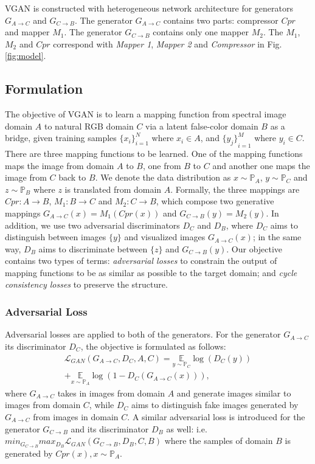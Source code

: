 \documentclass[10pt,conference,a4paper]{IEEEtran}
\begin{document}
VGAN is constructed with heterogeneous network architecture for generators $G_{A\rightarrow C}$ and $G_{C\rightarrow B}$.
The generator $G_{A\rightarrow C}$ contains two parts: compressor $Cpr$ and mapper $M_1$. The generator $G_{C\rightarrow B}$ contains only one mapper $M_2$. The $M_1$, $M_2$ and $Cpr$ correspond with \textit{Mapper 1}, \textit{Mapper 2} and \textit{Compressor} in Fig. \ref{fig:model}.

\subsection{Formulation}
The objective of VGAN is to learn a mapping function from spectral image domain $A$ to natural RGB domain $C$ via a latent false-color domain $B$ as a bridge, given training samples ${\{x_i\}}_{i=1}^N$ where $x_i \in A$, and ${\{y_j\}}_{i=1}^M$ where $y_i \in C$. There are three mapping functions to be learned. One of the mapping functions maps the image from domain $A$ to $B$, one from $B$ to $C$ and another one maps the image from $C$ back to $B$. We denote the data distribution as $x\sim \mathbb{P}_A$, $y\sim \mathbb{P}_C$ and $z\sim \mathbb{P}_B$ where $z$ is translated from domain $A$. Formally, the three mappings are $Cpr:A\rightarrow B$, $M_1:B\rightarrow C$ and $M_2:C\rightarrow B$, which compose two generative mappings $G_{A\rightarrow C}(x)=M_1(Cpr(x))$ and $G_{C\rightarrow B}(y)=M_2(y)$. In addition, we use two adversarial discriminators $D_C$ and $D_B$, where $D_C$ aims to distinguish between images $\{y\}$ and visualized images $G_{A\rightarrow C}(x)$; in the same way, $D_B$ aims to discriminate between $\{z\}$ and $G_{C\rightarrow B}(y)$. Our objective contains two types of terms: \textit{adversarial losses} to constrain the output of mapping functions to be as similar as possible to the target domain; and \textit{cycle consistency losses} to preserve the structure.

\subsubsection{Adversarial Loss}
Adversarial losses are applied to both of the generators. For the generator $G_{A\rightarrow C}$ its discriminator $D_C$, the objective is formulated as follows:
\begin{multline}\label{eq:adv_loss}
  \mathcal{L}_{GAN}(G_{A\rightarrow C},D_C,A,C) = \underset{y\sim \mathbb{P}_C}{\mathbb{E}} \log(D_C(y)) \\
  + \underset{x\sim \mathbb{P}_A}{\mathbb{E}} \log(1-D_C(G_{A\rightarrow C}(x))),
\end{multline}
where $G_{A\rightarrow C}$ takes in images from domain $A$ and generate images similar to images from domain $C$, while $D_C$ aims to distinguish fake images generated by $G_{A\rightarrow C}$ from images in domain $C$. A similar adversarial loss is introduced for the generator $G_{C\rightarrow B}$ and its discriminator $D_B$ as well: i.e. $min_{G_{C\rightarrow B}}max_{D_B}\mathcal{L}_{GAN}(G_{C\rightarrow B},D_B,C,B)$ where the samples of domain $B$ is generated by $Cpr(x), x\sim \mathbb{P}_A$.
\end{document}
